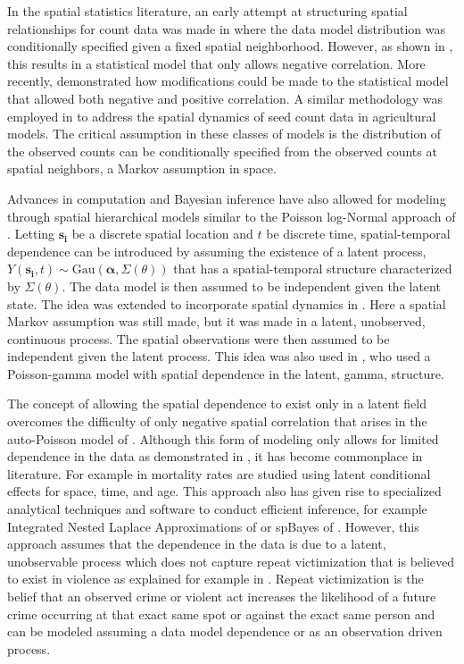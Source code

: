 \documentclass[11pt]{isuthesis}
\begin{document}
In the spatial statistics literature, an early attempt at structuring spatial relationships for count data was made in \cite{besag1974spatial} where the data model distribution was conditionally specified given a fixed spatial neighborhood.  However, as shown in \cite{besag1974spatial}, this results in a statistical model that only allows negative correlation.  More recently, \cite{kaiser1997modeling} demonstrated how modifications could be made to the statistical model that allowed both negative and positive correlation.  A similar methodology was employed in \cite{augustin2006using} to address the spatial dynamics of seed count data in agricultural models.  The critical assumption in these classes of models is the distribution of the observed counts can be conditionally specified from the observed counts at spatial neighbors, a Markov assumption in space.

Advances in computation and Bayesian inference have also allowed for modeling through spatial hierarchical models similar to the Poisson log-Normal approach of \cite{aitchison1989multivariate}. Letting $\boldsymbol{s_i}$ be a discrete spatial location and $t$ be discrete time, spatial-temporal dependence can be introduced by assuming the existence of a latent process, $Y(\boldsymbol{s_i},t)\sim \mbox{Gau}(\boldsymbol{\alpha},\Sigma(\theta))$ that has a spatial-temporal structure characterized by $\Sigma(\theta)$.  The data model is then assumed to be independent given the latent state. The idea was extended to incorporate spatial dynamics in \cite{besag1991bayesian}.  Here a spatial Markov assumption was still made, but it was made in a latent, unobserved, continuous process.  The spatial observations were then assumed to be independent given the latent process.  This idea was also used in \cite{wolpert1998poisson}, who used a Poisson-gamma model with spatial dependence in the latent, gamma, structure.

The concept of allowing the spatial dependence to exist only in a latent field overcomes the difficulty of only negative spatial correlation that arises in the auto-Poisson model of \cite{besag1974spatial}.  Although this form of modeling only allows for limited dependence in the data as demonstrated in \cite{aitchison1989multivariate}, it has become commonplace in literature.  For example in \cite{goicoa2016age} mortality rates are studied using latent conditional effects for space, time, and age.  This approach also has given rise to specialized analytical techniques and software to conduct efficient inference, for example Integrated Nested Laplace Approximations of \cite{rue2009approximate} or spBayes of \cite{finley2007spbayes}.  However, this approach assumes that the dependence in the data is due to a latent, unobservable process which does not capture  repeat victimization that is believed to exist in violence as explained for example in \cite{polvi1990repeat}.  Repeat victimization is the belief that an observed crime or violent act increases the likelihood of a future crime occurring at that exact same spot or against the exact same person and can be modeled assuming a data model dependence or as an observation driven process.
\end{document}
